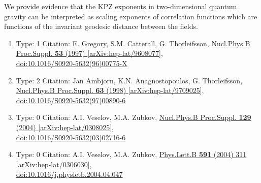 \documentclass[a4paper,10pt]{article}
\begin{document}
\begin{enumerate}
We provide evidence that the KPZ exponents in two-dimensional quantum gravity can be interpreted as scaling exponents of correlation functions which are functions of the invariant geodesic distance between the fields.
\begin{enumerate}
  \item Type: 1 Citation: E. Gregory, S.M. Catterall, G. Thorleifsson, \href{https://www.doi.org/10.1016/S0920-5632(96)00775-X}{Nucl.Phys.B Proc.Suppl. {\bf 53} (1997) }  \href{https://arxiv.org/abs/hep-lat/9608077}{[arXiv:hep-lat/9608077]},\\\href{https://www.doi.org/10.1016/S0920-5632(96)00775-X}{doi:10.1016/S0920-5632(96)00775-X}
  \item Type: 2 Citation: Jan Ambjorn, K.N. Anagnostopoulos, G. Thorleifsson, \href{https://www.doi.org/10.1016/S0920-5632(97)00890-6}{Nucl.Phys.B Proc.Suppl. {\bf 63} (1998) }  \href{https://arxiv.org/abs/hep-lat/9709025}{[arXiv:hep-lat/9709025]},\\\href{https://www.doi.org/10.1016/S0920-5632(97)00890-6}{doi:10.1016/S0920-5632(97)00890-6}
  \item Type: 0 Citation: A.I. Veselov, M.A. Zubkov, \href{https://www.doi.org/10.1016/S0920-5632(03)02716-6}{Nucl.Phys.B Proc.Suppl. {\bf 129} (2004) }  \href{https://arxiv.org/abs/hep-lat/0308025}{[arXiv:hep-lat/0308025]},\\\href{https://www.doi.org/10.1016/S0920-5632(03)02716-6}{doi:10.1016/S0920-5632(03)02716-6}
  \item Type: 0 Citation: A.I. Veselov, M.A. Zubkov, \href{https://www.doi.org/10.1016/j.physletb.2004.04.047}{Phys.Lett.B {\bf 591} (2004) 311}  \href{https://arxiv.org/abs/hep-lat/0306030}{[arXiv:hep-lat/0306030]},\\\href{https://www.doi.org/10.1016/j.physletb.2004.04.047}{doi:10.1016/j.physletb.2004.04.047}

\end{enumerate}
\end{enumerate}
\end{document}
